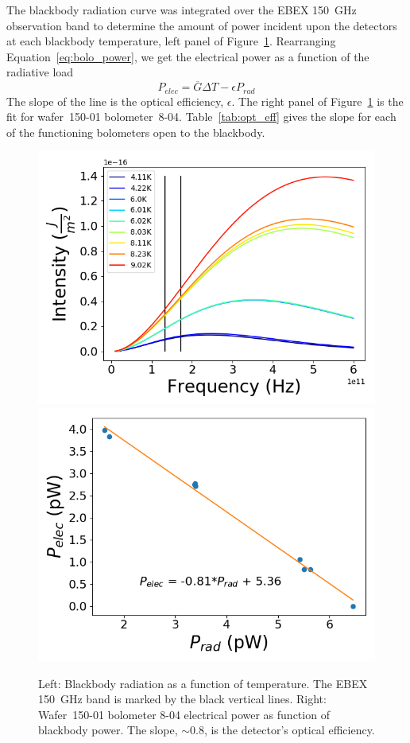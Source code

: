 The blackbody radiation curve was integrated over the \ac{EBEX} 150~GHz observation band to determine the amount of power incident upon the detectors at each blackbody temperature, left panel of Figure~\ref{fig:pelec_vs_popt}.
Rearranging Equation~\ref{eq:bolo_power}, we get the electrical power as a function of the radiative load
\begin{equation}
P_{elec} = \overline{G} \Delta T -  \epsilon P_{rad} 
\end{equation}
The slope of the line is the optical efficiency, $\epsilon$.
The right panel of Figure~\ref{fig:pelec_vs_popt} is the fit for wafer~150-01 bolometer~8-04. 
Table~\ref{tab:opt_eff} gives the slope for each of the functioning bolometers open to the blackbody. 

\begin{figure}[htp]
\begin{center}
\includegraphics[width=0.49\columnwidth]{figures/blackbody_intensity_plot.png}
\includegraphics[width=0.48\columnwidth]{figures/SqCh2_Ch1_p_vs_p.png}
\caption{Left: Blackbody radiation as a function of temperature. The \ac{EBEX} 150~GHz band is marked by the black vertical lines. Right: Wafer~150-01 bolometer 8-04 electrical power as function of blackbody power. The slope, $\sim0.8$, is the detector's optical efficiency. 
\label{fig:pelec_vs_popt} }
\end{center}
\end{figure}

